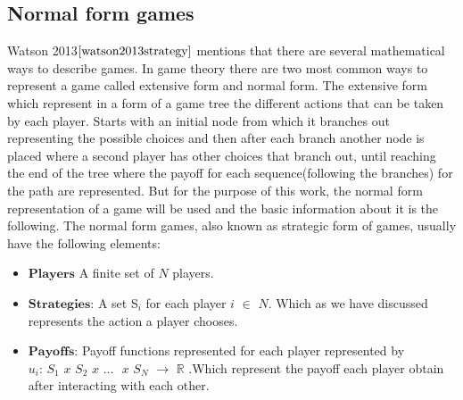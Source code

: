 \documentclass{book}
\begin{document}
\subsection{Normal form games}\label{second_section}
Watson 2013$\cite{watson2013strategy}$  mentions that there are several mathematical ways to describe games. In game theory there are two most common ways to represent a game called extensive form and normal form. The extensive form which represent in a form of a game tree the different actions that can be taken by each player. Starts with an initial node from which it branches out representing the possible choices and then after each branch another node is placed where a second player has other choices that branch out, until reaching the end of the tree where the payoff for each sequence(following the branches) for the path are represented. But for the purpose of this work, the normal form representation of a game will be used and the basic information about it is the following.
The normal form games, also known as strategic form of games, usually have the following elements:
\begin{itemize}
\item $\textbf{Players}$ A finite set of $\textit{N}$ players.
\item $\textbf{Strategies:}$ A set S$_i$ for each player $\textit{i}$ $\in$ $\textit{N}$. Which as we have discussed represents the action a player chooses.
\item $\textbf{Payoffs:}$ Payoff functions represented for each player represented by $\textit{u$_i$: S$_1$ x S$_2$ x}$ ... $\textit{ x S$_N$}$ $\rightarrow$ $\mathbb{R}$ .Which represent the payoff each player obtain after interacting with each other.
\end{itemize}
\end{document}
